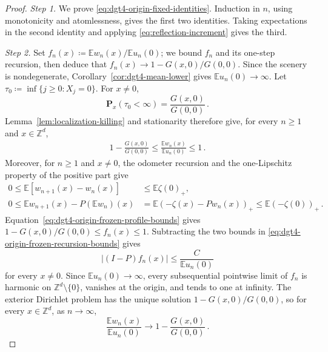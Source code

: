 \documentclass[11pt]{amsart}
\theoremstyle{plain}
\theoremstyle{definition}
\newcommand{\Z}{\mathbb{Z}}
\newcommand{\E}{\mathbb{E}}
\begin{document}
\begin{proof}

	\noindent\emph{Step 1.} We prove
	\eqref{eq:dgt4-origin-fixed-identities}.
	Induction in $n$, using monotonicity and atomlessness, gives the first two identities. Taking expectations in the
	second identity and applying \eqref{eq:reflection-increment} gives the third.

	\noindent\emph{Step 2.} Set $f_n(x)\coloneqq\E w_n(x)/\E u_n(0)$; we bound $f_n$ and its
	one-step recursion, then deduce that $f_n(x)\to1-G(x,0)/G(0,0)$. Since the scenery is
	nondegenerate,
	Corollary~\ref{cor:dgt4-mean-lower} gives $\E u_n(0)\to\infty$.
	Let $\tau_0\coloneqq\inf\{j\geq0:X_j=0\}$. For $x\ne0$,
	\[
	\mathbf P_x(\tau_0<\infty)=\frac{G(x,0)}{G(0,0)}\, .
	\]
	Lemma~\ref{lem:localization-killing} and stationarity therefore give, for every $n\geq 1$ and $x\in \Z^d$,
	\begin{equation}\label{eq:dgt4-origin-frozen-profile-bounds}
	\begin{aligned}
	1-\frac{G(x,0)}{G(0,0)}
	\leq \frac{\E w_n(x)}{\E u_n(0)}
	\leq1 \, .
	\end{aligned}
	\end{equation}
	Moreover, for $n\geq1$ and $x\ne0$, the odometer recursion and the
	one-Lipschitz property of the positive part give
	\begin{equation}\label{eq:dgt4-origin-frozen-recursion-bounds}
	\begin{aligned}
	0\leq\E[w_{n+1}(x)-w_n(x)]
	&\leq\E\zeta(0)_+,\\
	0\leq\E w_{n+1}(x)-P(\E w_n)(x)
	&=\E(-\zeta(x)-Pw_n(x))_+
	\leq\E(-\zeta(0))_+\, .
	\end{aligned}
	\end{equation}
	Equation~\eqref{eq:dgt4-origin-frozen-profile-bounds} gives
	$1-G(x,0)/G(0,0)\leq f_n(x)\leq1$. Subtracting the two bounds in
	\eqref{eq:dgt4-origin-frozen-recursion-bounds} gives
	\[
	\bigl|(I-P)f_n(x)\bigr|\leq\frac{C}{\E u_n(0)}
	\]
    for every $x\ne0$.
	Since $\E u_n(0)\to\infty$, every subsequential pointwise limit of $f_n$ is
	harmonic on $\mathbb Z^d\setminus\{0\}$, vanishes at the origin, and tends
	to one at infinity. The exterior Dirichlet problem has the unique solution
	$1-G(x,0)/G(0,0)$, so for every $x\in \Z^d$, as $n\to\infty$,
	\begin{equation}\label{eq:dgt4-origin-frozen-profile-limit}
		\frac{\E w_n(x)}{\E u_n(0)}
		\longrightarrow
		1-\frac{G(x,0)}{G(0,0)}\, .
	\end{equation}


\end{proof}
\end{document}
